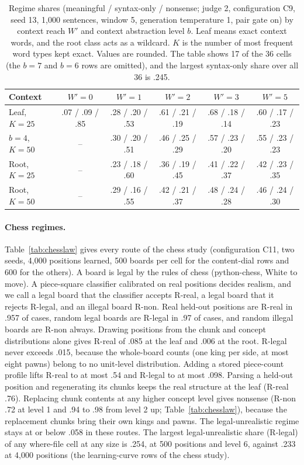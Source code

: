 \documentclass[11pt,letterpaper]{article}
\begin{document}
\begin{table}[h]
\caption{Regime shares (meaningful / syntax-only / nonsense; judge 2, configuration C9, seed 13, 1,000 sentences, window 5, generation temperature 1, pair gate on) by context reach $W'$ and context abstraction level $b$.
Leaf means exact context words, and the root class acts as a wildcard. $K$ is the number of most frequent word types kept exact. Values are rounded.
The table shows 17 of the 36 cells (the $b=7$ and $b=6$ rows are omitted), and the largest syntax-only share over all 36 is .245.}
\label{tab:ctx}
\begin{center}
\footnotesize
\begin{tabular}{lccccc}
\toprule
Context & $W'=0$ & $W'=1$ & $W'=2$ & $W'=3$ & $W'=5$ \\
\midrule
Leaf, $K=25$ & .07 / .09 / .85 & .28 / .20 / .53 & .61 / .21 / .19 & .68 / .18 / .14 & .60 / .17 / .23 \\
$b=4$, $K=50$ & -- & .30 / .20 / .51 & .46 / .25 / .29 & .57 / .23 / .20 & .55 / .23 / .23 \\
Root, $K=25$ & -- & .23 / .18 / .60 & .36 / .19 / .45 & .41 / .22 / .37 & .42 / .23 / .35 \\
Root, $K=50$ & -- & .29 / .16 / .55 & .42 / .21 / .37 & .48 / .24 / .28 & .46 / .24 / .30 \\
\bottomrule
\end{tabular}
\end{center}
\end{table}

\paragraph{Chess regimes.} Table~\ref{tab:chesslaw} gives every route of the chess study (configuration C11, two seeds, 4,000 positions learned, 500 boards per cell for the content-dial rows and 600 for the others).
A board is legal by the rules of chess (python-chess, White to move). A piece-square classifier calibrated on real positions decides realism, and we call a legal board that the classifier accepts R-real, a legal board that it rejects R-legal, and an illegal board R-non.
Real held-out positions are R-real in .957 of cases, random legal boards are R-legal in .97 of cases, and random illegal boards are R-non always.
Drawing positions from the chunk and concept distributions alone gives R-real of .085 at the leaf and .006 at the root. R-legal never exceeds .015, because the whole-board counts (one king per side, at most eight pawns) belong to no unit-level distribution.
Adding a stored piece-count profile lifts R-real to at most .54 and R-legal to at most .098.
Parsing a held-out position and regenerating its chunks keeps the real structure at the leaf (R-real .76). Replacing chunk contents at any higher concept level gives nonsense (R-non .72 at level 1 and .94 to .98 from level 2 up; Table~\ref{tab:chesslaw}), because the replacement chunks bring their own kings and pawns. The legal-unrealistic regime stays at or below .058 in these routes.
The largest legal-unrealistic share (R-legal) of any where-file cell at any size is .254, at 500 positions and level 6, against .233 at 4,000 positions (the learning-curve rows of the chess study).
\end{document}
